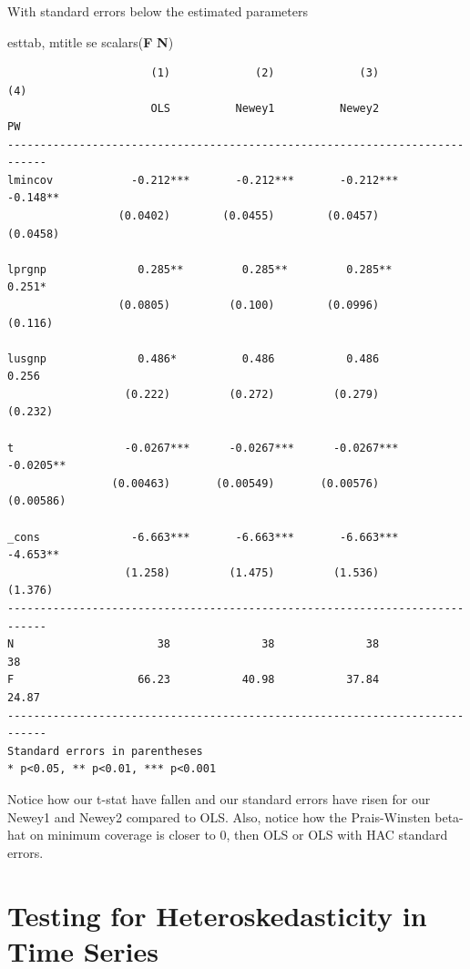 \documentclass[
]{book}
\newenvironment{Shaded}{\begin{snugshade}}{\end{snugshade}}
\newcommand{\FunctionTok}[1]{\textcolor[rgb]{0.13,0.29,0.53}{\textbf{#1}}}
\newcommand{\KeywordTok}[1]{\textcolor[rgb]{0.13,0.29,0.53}{\textbf{#1}}}
\newcommand{\NormalTok}[1]{#1}
\begin{document}
With standard errors below the estimated parameters

\begin{Shaded}
\begin{Highlighting}[]
\NormalTok{esttab, mtitle se scalars(}\FunctionTok{F} \KeywordTok{N}\NormalTok{)}
\end{Highlighting}
\end{Shaded}

\begin{verbatim}
                      (1)             (2)             (3)             (4)   
                      OLS          Newey1          Newey2              PW   
----------------------------------------------------------------------------
lmincov            -0.212***       -0.212***       -0.212***       -0.148** 
                 (0.0402)        (0.0455)        (0.0457)        (0.0458)   

lprgnp              0.285**         0.285**         0.285**         0.251*  
                 (0.0805)         (0.100)        (0.0996)         (0.116)   

lusgnp              0.486*          0.486           0.486           0.256   
                  (0.222)         (0.272)         (0.279)         (0.232)   

t                 -0.0267***      -0.0267***      -0.0267***      -0.0205** 
                (0.00463)       (0.00549)       (0.00576)       (0.00586)   

_cons              -6.663***       -6.663***       -6.663***       -4.653** 
                  (1.258)         (1.475)         (1.536)         (1.376)   
----------------------------------------------------------------------------
N                      38              38              38              38   
F                   66.23           40.98           37.84           24.87   
----------------------------------------------------------------------------
Standard errors in parentheses
* p<0.05, ** p<0.01, *** p<0.001
\end{verbatim}

Notice how our t-stat have fallen and our standard errors have risen for our
Newey1 and Newey2 compared to OLS. Also, notice how the Prais-Winsten beta-hat
on minimum coverage is closer to 0, then OLS or OLS with HAC standard errors.

\section{Testing for Heteroskedasticity in Time Series}\label{testing-for-heteroskedasticity-in-time-series}
\end{document}
